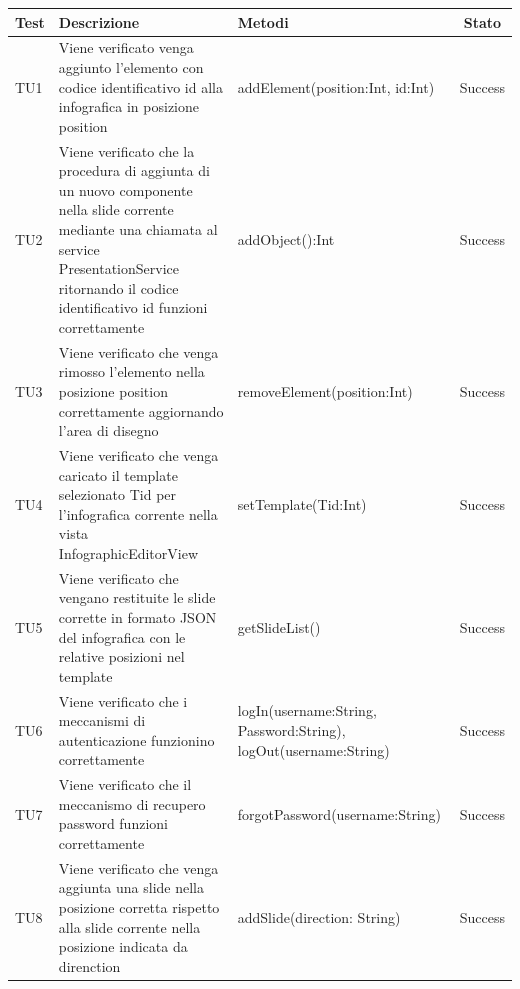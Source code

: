 \begin{table}[h]
	\begin{center}
	\begin{tabular}{|l|p{}|p{}|c|}
	\toprule
		\textbf{Test} & \textbf{Descrizione} & \textbf{Metodi} & \textbf{Stato}\\
	\midrule
		TU1 & Viene verificato venga aggiunto l'elemento con codice identificativo id alla infografica
in posizione position & addElement(position:Int, id:Int) & Success\\
	\midrule
		TU2 & Viene verificato che la procedura di aggiunta di un nuovo componente nella slide corrente mediante una chiamata al service PresentationService ritornando il codice identificativo id funzioni correttamente & addObject():Int & Success\\
	\midrule
		TU3 & Viene verificato che venga rimosso l'elemento nella posizione position correttamente aggiornando l'area di disegno & removeElement(position:Int) & Success\\
	\midrule
		TU4 & Viene verificato che venga caricato il template selezionato Tid per l'infografica corrente nella vista InfographicEditorView & setTemplate(Tid:Int) & Success\\
	\midrule
		TU5 & Viene verificato che vengano restituite le slide corrette in formato JSON del infografica con le relative posizioni nel template & getSlideList() & Success\\
	\midrule
		TU6 & Viene verificato che i meccanismi di autenticazione funzionino correttamente & logIn(username:String, Password:String), logOut(username:String) & Success\\
	\midrule
		TU7 & Viene verificato che il meccanismo di recupero password funzioni correttamente & forgotPassword(username:String) & Success\\
	\midrule
		TU8 & Viene verificato che venga aggiunta una slide nella posizione corretta rispetto alla slide corrente nella posizione indicata da direnction & addSlide(direction: String) & Success\\
	\midrule
\end{tabular}
\end{center}	
\end{table}
\newpage
